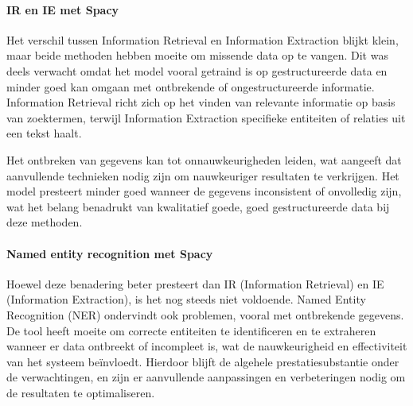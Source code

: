 %

\paragraph{IR en IE met Spacy}
Het verschil tussen Information Retrieval en Information Extraction blijkt klein, maar beide methoden hebben moeite om missende data op te vangen. Dit was deels verwacht omdat het model vooral getraind is op gestructureerde data en minder goed kan omgaan met ontbrekende of ongestructureerde informatie. Information Retrieval richt zich op het vinden van relevante informatie op basis van zoektermen, terwijl Information Extraction specifieke entiteiten of relaties uit een tekst haalt. 

Het ontbreken van gegevens kan tot onnauwkeurigheden leiden, wat aangeeft dat aanvullende technieken nodig zijn om nauwkeuriger resultaten te verkrijgen. Het model presteert minder goed wanneer de gegevens inconsistent of onvolledig zijn, wat het belang benadrukt van kwalitatief goede, goed gestructureerde data bij deze methoden. 


\paragraph{Named entity recognition met Spacy}
Hoewel deze benadering beter presteert dan IR (Information Retrieval) en IE (Information Extraction), is het nog steeds niet voldoende. Named Entity Recognition (NER) ondervindt ook problemen, vooral met ontbrekende gegevens. De tool heeft moeite om correcte entiteiten te identificeren en te extraheren wanneer er data ontbreekt of incompleet is, wat de nauwkeurigheid en effectiviteit van het systeem beïnvloedt. Hierdoor blijft de algehele prestatiesubstantie onder de verwachtingen, en zijn er aanvullende aanpassingen en verbeteringen nodig om de resultaten te optimaliseren.
